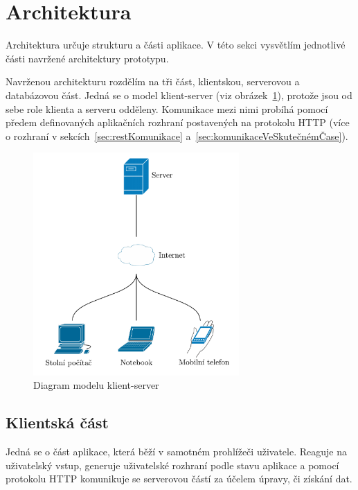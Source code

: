 
\section{Architektura}\label{sec:architektura}

Architektura určuje strukturu a části aplikace.
V této sekci vysvětlím jednotlivé části navržené architektury prototypu.

Navrženou architekturu rozdělím na tři část, klientskou, serverovou a databázovou část.
Jedná se o model klient-server (viz obrázek~\ref{fig:client_server}), protože jsou od sebe role klienta a serveru odděleny.
Komunikace mezi nimi probíhá pomocí předem definovaných aplikačních rozhraní postavených na protokolu \gls{HTTP} (více o rozhraní v sekcích~\ref{sec:restKomunikace} a~\ref{sec:komunikaceVeSkutečnémČase}).

\begin{figure}[ht!]
    \centering
    \includegraphics[width=0.7\textwidth]{partials/navrh/clientServer.pdf}
    \caption{Diagram modelu klient-server}\label{fig:client_server}
\end{figure}

\subsection{Klientská část}\label{subsec:klientskáČást}

Jedná se o část aplikace, která běží v samotném prohlížeči uživatele.
Reaguje na uživatelský vstup, generuje uživatelské rozhraní podle stavu aplikace a pomocí protokolu \gls{HTTP} komunikuje se serverovou částí za účelem úpravy, či získání dat.

